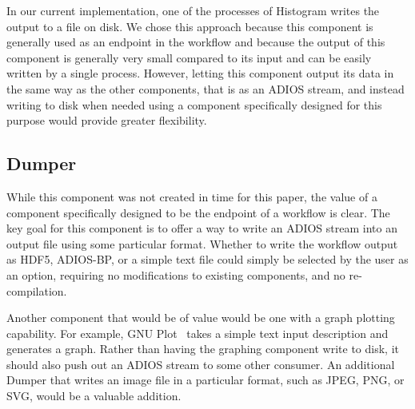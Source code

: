 In our current implementation, one of the processes
of Histogram writes the
output to a file on disk. We chose this approach
because this component is generally used as an
endpoint in the workflow and because the output of this
component is generally very small compared to its input
and can be easily written by a single process.
However, letting this component output
its data in the same way as the other components,
that is as an ADIOS stream, and instead writing to
disk when needed using a component specifically
designed for this purpose would
provide greater flexibility.



\subsection{Dumper}

While this component was not created in time for this paper, the value of
a component specifically designed to be the endpoint of a workflow
is clear. The key goal for this component is to offer a way to write an ADIOS stream into an
output file using some particular format. Whether to write the workflow output as
HDF5, ADIOS-BP, or a simple text file could simply be selected by the user as an option,
requiring no modifications to existing components, and no re-compilation.

Another component that would be of value would be one with a graph plotting capability.
For example, GNU
Plot~\cite{racine:2006:gnuplot} takes a simple text input description and
generates a graph.  Rather than having the graphing component write to
disk, it should also push out an ADIOS stream to some other consumer. An
additional Dumper that writes an image file in a particular format, such as
JPEG, PNG, or SVG, would be a valuable addition.
\fi
